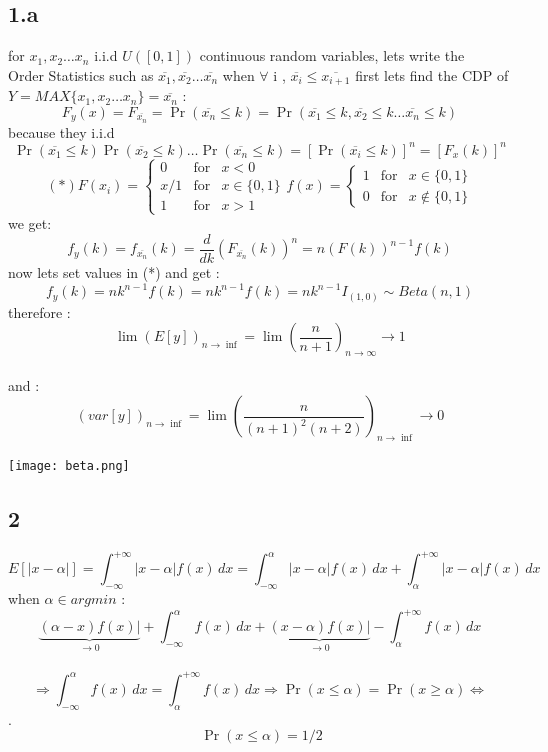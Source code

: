 \documentclass[12pt]{article}
\begin{document}
\subsection*{1.a}
for $x_1,x_2\ldots x_n$  i.i.d $U([0, 1])$ continuous random variables, lets write the  \\Order Statistics such as  $\overline{x_1} ,\overline{x_2}\ldots \overline{x_n}$ when $\forall$ i , $\overline{x_i} \leq \overline{x_{i+1}}$
first lets find the CDP of $Y=MAX\lbrace x_1,x_2\ldots x_n \rbrace=\overline{x_n}$ :\\
\[F_y(x)=F_{ \overline{x_n}}=\Pr(\overline{x_n}\leq k)=\Pr(\overline{x_1}\leq k,\overline{x_2}\leq k\ldots\overline{x_n}\leq k)\] because they i.i.d 
\[\Pr(\overline{x_1}\leq k)\Pr(\overline{x_2}\leq k)\ldots\Pr(\overline{x_n}\leq k)=[\Pr(\overline{x_i}\leq k)]^n=[F_x(k)]^n\]
\[(*)  F(x_i) = \left\{ \begin{array}{rcl}
{0} & \mbox{for}
& x<0 \\ x/1 & \mbox{for} & x\in\lbrace0,1\rbrace \\
1 & \mbox{for} & x>1
\end{array}\right.
f(x) = \left\{ \begin{array}{rcl}
{1} & \mbox{for}
& x\in\lbrace0,1\rbrace\\ 0 & \mbox{for} & x\notin\lbrace0,1\rbrace 
\end{array}\right.\] we get:
\[f_y(k)=f_{\overline{x_n}}(k)=\frac{d}{dk}(F_{\overline{x_n}}(k))^n=n(F(k))^{n-1}f(k)\] now lets set values in (*) and get :\\
\[f_y(k)=nk^{n-1}f(k)=nk^{n-1}f(k)=nk^{n-1}I_{(1,0)}\sim Beta(n,1)\]  therefore : 
\[ \lim(E[y])_{ n\to \inf}= \lim(\frac{n}{n+1})_{ n\to \infty}\longrightarrow 1\]
\\
 and : \[ (var[y])_{ n\to \inf}= \lim(\frac{n}{(n+1)^2(n+2)})_{ n\to \inf}\rightarrow 0 \]
\begin{center}
\texttt{[image: beta.png]} 
\end{center}
\subsection*{2}
\[E[|x-\alpha |] =  \int^{+\infty}_{-\infty} |x-\alpha |f(x) \, dx =  \int^{\alpha}_{-\infty} |x-\alpha |f(x) \, dx  + \int^{+\infty}_{\alpha} |x-\alpha |f(x) \, dx \] when $\alpha \in argmin$ :\\  \[\underbrace{(\alpha -x)f(x)|}_{\to 0}+ \int^{\alpha}_{-\infty} f(x) \, dx + \underbrace{(x-\alpha)f(x)|}_{\to 0}- \int^{+\infty}_{\alpha} f(x) \, dx\] \\
\[\displaystyle{\Rightarrow  \int^{\alpha}_{-\infty} f(x) \, dx =\int^{+\infty}_{\alpha} f(x) \, dx} \Rightarrow \Pr(x\leq \alpha)=\Pr(x\geq \alpha)\Leftrightarrow \] .\\\[ \ { \Pr(x\leq \alpha)=1/2}\]
\end{document}
